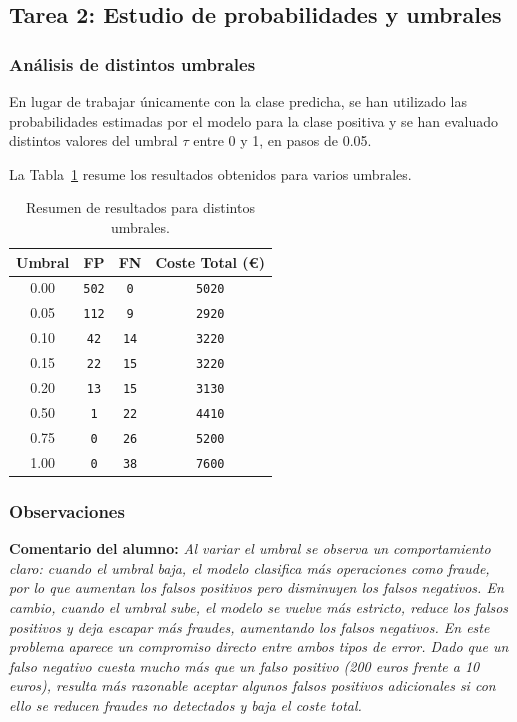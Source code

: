 \documentclass[12pt,oneside]{book}
\begin{document}
\subsection{Tarea 2: Estudio de probabilidades y umbrales}

\subsubsection{Análisis de distintos umbrales}
En lugar de trabajar únicamente con la clase predicha, se han utilizado las probabilidades estimadas por el modelo para la clase positiva y se han evaluado distintos valores del umbral \(\tau\) entre 0 y 1, en pasos de 0.05.

La Tabla~\ref{tab:umbrales_coste} resume los resultados obtenidos para varios umbrales.

\begin{table}[H]
\centering
\caption{Resumen de resultados para distintos umbrales.}
\label{tab:umbrales_coste}
\begin{tabular}{c c c c}
\toprule
\textbf{Umbral} & \textbf{FP} & \textbf{FN} & \textbf{Coste Total (€)} \\
\midrule
0.00 & \texttt{502} & \texttt{0} & \texttt{5020} \\
0.05 & \texttt{112} & \texttt{9} & \texttt{2920} \\
0.10 & \texttt{42} & \texttt{14} & \texttt{3220} \\
0.15 & \texttt{22} & \texttt{15} & \texttt{3220} \\
0.20 & \texttt{13} & \texttt{15} & \texttt{3130} \\
0.50 & \texttt{1} & \texttt{22} & \texttt{4410} \\
0.75 & \texttt{0} & \texttt{26} & \texttt{5200} \\
1.00 & \texttt{0} & \texttt{38} & \texttt{7600} \\
\bottomrule
\end{tabular}
\end{table}

\subsubsection{Observaciones}
\textbf{Comentario del alumno:}  
\textit{\textit{Al variar el umbral se observa un comportamiento claro: cuando el umbral baja, el modelo clasifica más operaciones como fraude, por lo que aumentan los falsos positivos pero disminuyen los falsos negativos. En cambio, cuando el umbral sube, el modelo se vuelve más estricto, reduce los falsos positivos y deja escapar más fraudes, aumentando los falsos negativos. En este problema aparece un compromiso directo entre ambos tipos de error. Dado que un falso negativo cuesta mucho más que un falso positivo (200 euros frente a 10 euros), resulta más razonable aceptar algunos falsos positivos adicionales si con ello se reducen fraudes no detectados y baja el coste total.}}
\end{document}
